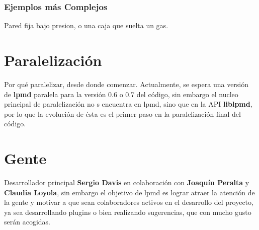 \documentclass[a4paper,10pt]{scrbook}
\newcommand{\lpmd}{\textbf{lpmd }}
\begin{document}
\subsection{Ejemplos m\'as Complejos}
Pared fija bajo presion, o una caja que suelta un gas.

\chapter{Paralelizaci\'on}

Por qu\'e paralelizar, desde donde comenzar. Actualmente, se espera una versi\'on de \lpmd paralela para la versi\'on 0.6 o 0.7 del c\'odigo, sin embargo el nucleo principal de paralelizaci\'on no s encuentra en lpmd, sino que en la API \textbf{liblpmd}, por lo que la evoluci\'on de \'esta es el primer paso en la paralelizaci\'on final del c\'odigo.


\chapter{Gente}
\label{chap:auth}

Desarrollador principal \textbf{Sergio Davis} en colaboraci\'on con \textbf{Joaqu\'in Peralta} y \textbf{Claudia Loyola}, sin embargo el objetivo de lpmd es lograr atraer la atenci\'on de la gente y motivar a que sean colaboradores activos en el desarrollo del proyecto, ya sea desarrollando plugins o bien realizando sugerencias, que con mucho gusto ser\'an acogidas.
\end{document}
